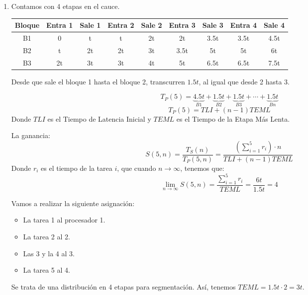 \begin{ejercicio}
\begin{enumerate}
    \item
    Contamos con 4 etapas en el cauce.
\begin{table}[H]
    \begin{tabular}{|c|c|c|c|c|c|c|c|c|}
        \hline
        Bloque & Entra 1 & Sale 1 & Entra 2 & Sale 2 & Entra 3 & Sale 3 & Entra 4 & Sale 4 \\
        \hline
        B1 & 0 & t & t & 2t & 2t & 3.5t & 3.5t & 4.5t \\
        B2 & t & 2t & 2t & 3t & 3.5t & 5t & 5t & 6t \\
        B3 & 2t & 3t & 3t & 4t & 5t & 6.5t & 6.5t & 7.5t\\
        \hline
    \end{tabular}
\end{table}
Desde que sale el bloque 1 hasta el bloque 2, transcurren $1.5t$, al igual que desde 2 hasta 3.

\begin{equation*}
    T_P(5) = \underbrace{4.5t}_{B1} + \underbrace{1.5t}_{B2} + \underbrace{1.5t}_{B3} + \cdots + \underbrace{1.5t}_{Bn}
\end{equation*}
\begin{equation*}
    T_P(5) = TLI + (n-1)TEML
\end{equation*}
Donde $TLI$ es el Tiempo de Latencia Inicial y $TEML$ es el Tiempo de la Etapa Más Lenta.

La ganancia:
\begin{equation*}
    S(5,n) = \dfrac{T_S(n)}{T_P(5,n)} = \dfrac{\left(\sum\limits_{i=1}^{5}r_i \right)\cdot n}{TLI + (n-1)TEML}
\end{equation*}
Donde $r_i$ es el tiempo de la tarea $i$, que cuando $n\rightarrow\infty$, tenemos que:
\begin{equation*}
    \lim_{n\to\infty}S(5,n) = \dfrac{\sum\limits_{i=1}^{5}r_i}{TEML} = \dfrac{6t}{1.5t} = 4
\end{equation*}

Vamos a realizar la siguiente asignación:
    \begin{itemize}
        \item La tarea 1 al procesador 1.
        \item La tarea 2 al 2.
        \item Las 3 y la 4 al 3.
        \item La tarea 5 al 4.
    \end{itemize}
    Se trata de una distribución en 4 etapas para segmentación. Así, tenemos $TEML = 1.5t\cdot 2=3t$.


\end{enumerate}
\end{ejercicio}
